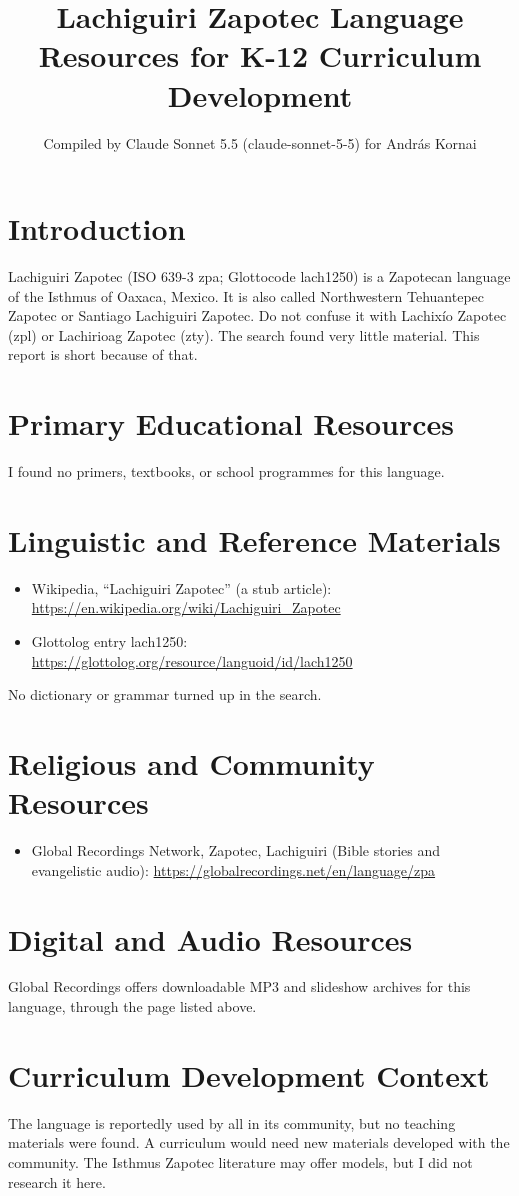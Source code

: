 \documentclass[12pt]{article}
\title{Lachiguiri Zapotec Language Resources for K-12 Curriculum Development}
\author{Compiled by Claude Sonnet 5.5 (claude-sonnet-5-5) for Andr\'as Kornai}
\date{}
\begin{document}
\maketitle

\section{Introduction}
Lachiguiri Zapotec (ISO 639-3 zpa; Glottocode lach1250) is a Zapotecan language of the Isthmus of Oaxaca, Mexico. It is also called Northwestern Tehuantepec Zapotec or Santiago Lachiguiri Zapotec. Do not confuse it with Lachix\'io Zapotec (zpl) or Lachirioag Zapotec (zty). The search found very little material. This report is short because of that.

\section{Primary Educational Resources}
I found no primers, textbooks, or school programmes for this language.

\section{Linguistic and Reference Materials}
\begin{itemize}
\item Wikipedia, ``Lachiguiri Zapotec'' (a stub article): \url{https://en.wikipedia.org/wiki/Lachiguiri_Zapotec}
\item Glottolog entry lach1250: \url{https://glottolog.org/resource/languoid/id/lach1250}
\end{itemize}
No dictionary or grammar turned up in the search.

\section{Religious and Community Resources}
\begin{itemize}
\item Global Recordings Network, Zapotec, Lachiguiri (Bible stories and evangelistic audio): \url{https://globalrecordings.net/en/language/zpa}
\end{itemize}

\section{Digital and Audio Resources}
Global Recordings offers downloadable MP3 and slideshow archives for this language, through the page listed above.

\section{Curriculum Development Context}
The language is reportedly used by all in its community, but no teaching materials were found. A curriculum would need new materials developed with the community. The Isthmus Zapotec literature may offer models, but I did not research it here.
\end{document}
